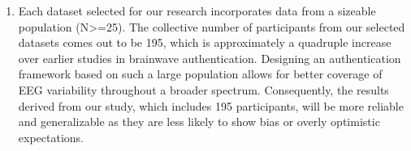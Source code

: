 \begin{enumerate}


\item Each dataset selected for our research incorporates data from a sizeable population (N>=25). The collective number of participants from our selected datasets comes out to be 195, which is approximately a quadruple increase over earlier studies in brainwave authentication. Designing an authentication framework based on such a large population allows for better coverage of EEG variability throughout a broader spectrum. Consequently, the results derived from our study, which includes 195 participants, will be more reliable and generalizable as they are less likely to show bias or overly optimistic expectations.     
\end{enumerate}
\smallskip

